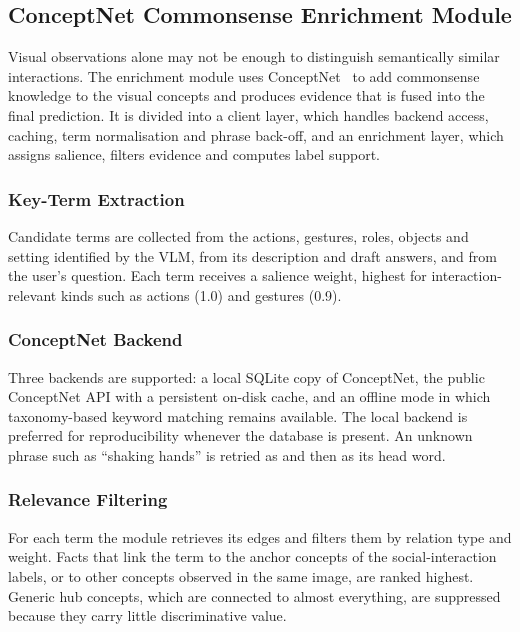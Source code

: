 \subsection{ConceptNet Commonsense Enrichment Module}
\label{sec:conceptnet}

Visual observations alone may not be enough to distinguish semantically similar interactions. The enrichment module uses ConceptNet~\cite{speer2017conceptnet} to add commonsense knowledge to the visual concepts and produces evidence that is fused into the final prediction. It is divided into a client layer, which handles backend access, caching, term normalisation and phrase back-off, and an enrichment layer, which assigns salience, filters evidence and computes label support.

\subsubsection{Key-Term Extraction}
Candidate terms are collected from the actions, gestures, roles, objects and setting identified by the VLM, from its description and draft answers, and from the user's question. Each term receives a salience weight, highest for interaction-relevant kinds such as actions (1.0) and gestures (0.9).

\subsubsection{ConceptNet Backend}
Three backends are supported: a local SQLite copy of ConceptNet, the public ConceptNet API with a persistent on-disk cache, and an offline mode in which taxonomy-based keyword matching remains available. The local backend is preferred for reproducibility whenever the database is present. An unknown phrase such as ``shaking hands'' is retried as  and then as its head word.

\subsubsection{Relevance Filtering}
For each term the module retrieves its edges and filters them by relation type and weight. Facts that link the term to the anchor concepts of the social-interaction labels, or to other concepts observed in the same image, are ranked highest. Generic hub concepts, which are connected to almost everything, are suppressed because they carry little discriminative value.

